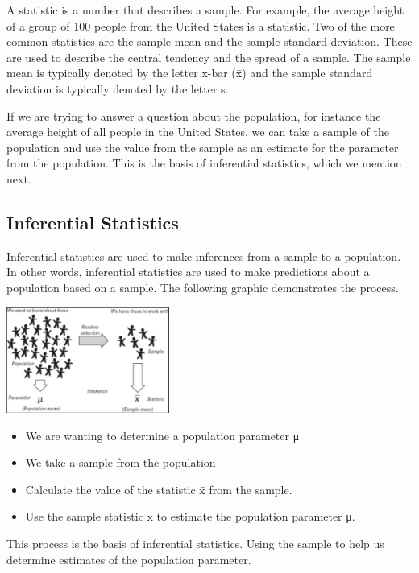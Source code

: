 \documentclass[
  letterpaper,
  DIV=11,
  numbers=noendperiod]{scrreprt}
\providecommand{\tightlist}{%
  \setlength{\itemsep}{0pt}\setlength{\parskip}{0pt}}\usepackage{longtable,booktabs,array}
\begin{document}
A statistic is a number that describes a sample. For example, the
average height of a group of 100 people from the United States is a
statistic. Two of the more common statistics are the sample mean and the
sample standard deviation. These are used to describe the central
tendency and the spread of a sample. The sample mean is typically
denoted by the letter x-bar (x̄) and the sample standard deviation is
typically denoted by the letter s.

If we are trying to answer a question about the population, for instance
the average height of all people in the United States, we can take a
sample of the population and use the value from the sample as an
estimate for the parameter from the population. This is the basis of
inferential statistics, which we mention next.

\subsection*{Inferential Statistics}\label{inferential-statistics}

Inferential statistics are used to make inferences from a sample to a
population. In other words, inferential statistics are used to make
predictions about a population based on a sample. The following graphic
demonstrates the process.

\includegraphics[width=0.4\textwidth,height=\textheight]{./images/SL_1.jpg}

\begin{itemize}
\tightlist
\item
  We are wanting to determine a population parameter μ
\item
  We take a sample from the population
\item
  Calculate the value of the statistic x̄ from the sample.
\item
  Use the sample statistic x to estimate the population parameter μ.
\end{itemize}

This process is the basis of inferential statistics. Using the sample to
help us determine estimates of the population parameter.
\end{document}
